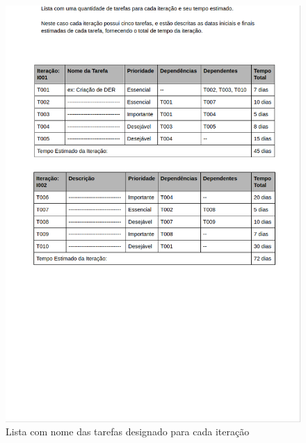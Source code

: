 \documentclass[	DIV=calc,%
							paper=a4,%
							fontsize=12pt,%
							onecolumn]{scrartcl}	 					%
\begin{document}
\begin{figure}
	\centering
	\includegraphics[width=\textwidth]{tarefas2}
	\caption{Lista com nome das tarefas designado para cada iteração}
	\label{Figura 4}
\end{figure}
\end{document}
